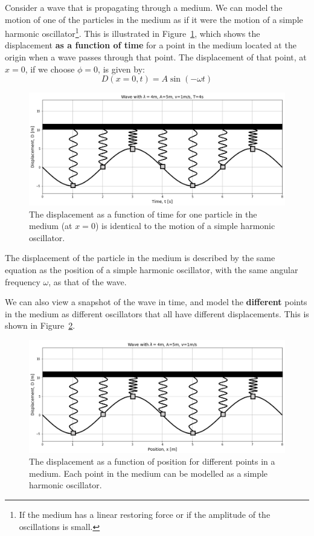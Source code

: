 Consider a wave that is propagating through a medium. We can model the motion of one of the particles in the medium as if it were the motion of a simple harmonic oscillator\footnote{If the medium has a linear restoring force or if the amplitude of the oscillations is small.}. This is illustrated in Figure~\ref{fig:waves:sinewavetimeshm}, which shows the displacement \textbf{as a function of time} for a point in the medium located at the origin when a wave passes through that point. The displacement of that point, at $x=0$, if we choose $\phi=0$, is given by:
\begin{equation}
D(x=0,t) = A\sin(-\omega t)
\end{equation}
\begin{figure}[!htbp]
\centering
\includegraphics[width=0.8\linewidth]{files/sinewavetimeshm-17f892d05b9c06df3c5af67634ed5e59.png}
\caption[]{The displacement as a function of time for one particle in the medium (at $x=0$) is identical to the motion of a simple harmonic oscillator.}
\label{fig:waves:sinewavetimeshm}
\end{figure}

The displacement of the particle in the medium is described by the same equation as the position of a simple harmonic oscillator, with the same angular frequency $\omega$, as that of the wave.

We can also view a snapshot of the wave in time, and model the \textbf{different} points in the medium as different oscillators that all have different displacements. This is shown in Figure~\ref{fig:waves:sinewavepositionshm}.

\begin{figure}[!htbp]
\centering
\includegraphics[width=0.8\linewidth]{files/sinewavepositionshm-741b248e606f6bc4de96e5802f76595e.png}
\caption[]{The displacement as a function of position for different points in a medium. Each point in the medium can be modelled as a simple harmonic oscillator.}
\label{fig:waves:sinewavepositionshm}
\end{figure}

